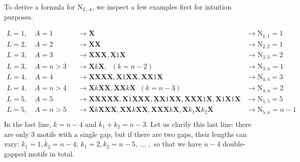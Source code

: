 \documentclass[fleqn, oneside, listof=totoc,%
 bibliography=totoc, paper=A4]{scrartcl}[2007/12/24]
\begin{document}
To derive a formula for $\mathrm{N}_{L,A}$, we inspect a few examples first for intuition purposes. 

\begin{align*}
L = 1,& \: A = 1 &&\rightarrow \mathbf{X} &\rightarrow \mathrm{N}_{1, 1} = 1\\
L = 2,& \: A = 2 &&\rightarrow \mathbf{XX} &\rightarrow \mathrm{N}_{2, 2} = 1\\
L = 3,& \: A = 3 &&\rightarrow \mathbf{XXX}, \mathbf{X}1 \mathbf{X} &\rightarrow \mathrm{N}_{3, 3} = 2\\
L = 3,& \: A = n > 3 &&\rightarrow \mathbf{X}k\mathbf{X}, \;\; (k = n - 2) &\rightarrow \mathrm{N}_{3, n} = 1\\
L = 4,& \: A = 4 &&\rightarrow \mathbf{XXXX}, \mathbf{X}1\mathbf{XX}, \mathbf{XX}1\mathbf{X} &\rightarrow \mathrm{N}_{4, 4} = 3\\
L = 4,& \: A = n > 4 &&\rightarrow \mathbf{X}k\mathbf{XX}, \mathbf{XX}k\mathbf{X} \;\; (k = n - 3)  &\rightarrow \mathrm{N}_{4, n} = 2\\
L = 5,& \: A = 5 &&\rightarrow \mathbf{XXXXX}, \mathbf{X}1\mathbf{XXX}, \mathbf{XX}1\mathbf{XX}, \mathbf{XXX}1\mathbf{X}, \mathbf{X}1\mathbf{X}1\mathbf{X} &\rightarrow \mathrm{N}_{5, 5} = 5\\
L = 5,& \: A = n > 5 &&\rightarrow \mathbf{X}k\mathbf{XXX}, \mathbf{XX}k\mathbf{XX}, \mathbf{XXX}k\mathbf{X}, \mathbf{X}k_1\mathbf{X}k_2\mathbf{X} 
 &\rightarrow \mathrm{N}_{5, n} = n-1\\
\end{align*}
In the last line, $k = n - 4$ and $k_1 + k_2 = n-3$. Let us clarify this last line: there are only $3$ motifs with a single gap, 
but if there are two gaps, their lengths can vary:
$k_1 = 1, k_2 = n-4$;\;\; $k_1 = 2, k_2 = n - 5, \; \dots \;,$ so that we have $n-4$ double-gapped motifs in total.
\end{document}
